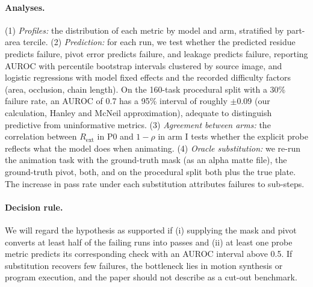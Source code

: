 \paragraph{Analyses.} (1) \emph{Profiles:} the distribution of each metric by model and arm, stratified by part-area tercile. (2) \emph{Prediction:} for each run, we test whether the predicted residue predicts  failure, pivot error predicts  failure, and leakage predicts  failure, reporting AUROC with percentile bootstrap intervals clustered by source image, and logistic regressions with model fixed effects and the recorded difficulty factors (area, occlusion, chain length). On the 160-task procedural split with a 30\% failure rate, an AUROC of 0.7 has a 95\% interval of roughly $\pm0.09$ (our calculation, Hanley and McNeil approximation), adequate to distinguish predictive from uninformative metrics. (3) \emph{Agreement between arms:} the correlation between $R_{\mathrm{ext}}$ in P0 and $1-\rho$ in arm I tests whether the explicit probe reflects what the model does when animating. (4) \emph{Oracle substitution:} we re-run the animation task with the ground-truth mask (as an alpha matte file), the ground-truth pivot, both, and on the procedural split both plus the true plate. The increase in pass rate under each substitution attributes failures to sub-steps.

\paragraph{Decision rule.} We will regard the hypothesis as supported if (i) supplying the mask and pivot converts at least half of the failing runs into passes and (ii) at least one probe metric predicts its corresponding check with an AUROC interval above 0.5. If substitution recovers few failures, the bottleneck lies in motion synthesis or program execution, and the paper should not describe \anibench{} as a cut-out benchmark.

